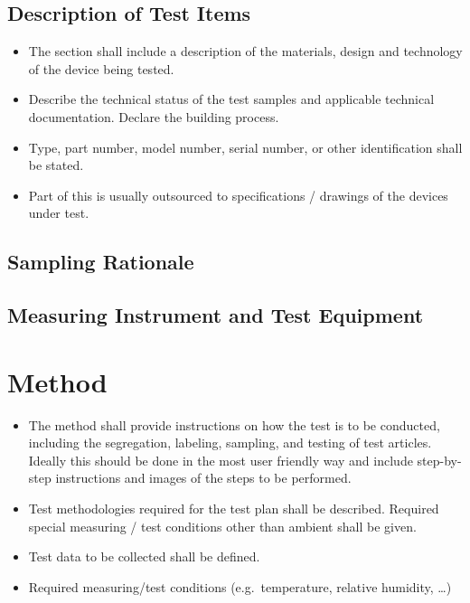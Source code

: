 \documentclass[plan]{mcitestdoc}
\begin{document}
\subsection{Description of Test Items}
\begin{hintblock}
\begin{itemize}
  \item The section shall include a description of the materials, design and technology of the device being tested.
  \item Describe the technical status of the test samples and applicable technical documentation. Declare the building process.
  \item Type, part number, model number, serial number, or other identification shall be stated.
  \item Part of this is usually outsourced to specifications / drawings of the devices under test.
\end{itemize}
\end{hintblock}

\subsection{Sampling Rationale}

\subsection{Measuring Instrument and Test Equipment}

\section{Method}
\begin{hintblock}
\begin{itemize}
  \item The method shall provide instructions on how the test is to be conducted, including the segregation, labeling, sampling, and testing of test articles. Ideally this should be done in the most user friendly way and include step-by-step instructions and images of the steps to be performed.
  \item Test methodologies required for the test plan shall be described. Required special measuring / test conditions other than ambient shall be given.
  \item Test data to be collected shall be defined.
  \item Required measuring/test conditions (e.g.\ temperature, relative humidity, \dots)
\end{itemize}
\end{hintblock}
\end{document}
